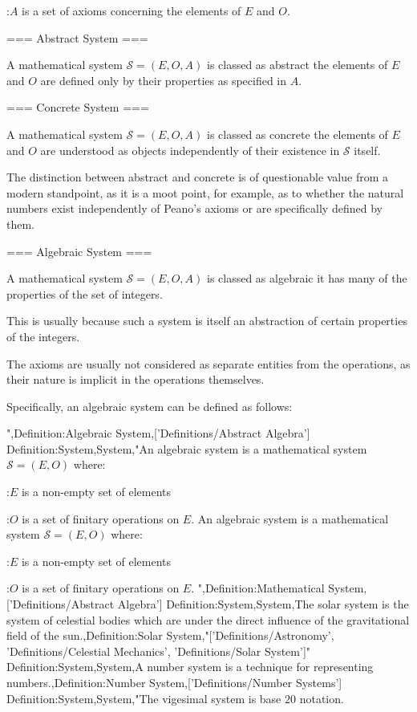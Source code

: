 :$A$ is a set of axioms concerning the elements of $E$ and $O$.


=== Abstract System ===

A mathematical system $\mathcal S = \left( E, O, A \right)$ is classed as abstract  the elements of $E$ and $O$ are defined only by their properties as specified in $A$.


=== Concrete System ===

A mathematical system $\mathcal S = \left( E, O, A \right)$ is classed as concrete  the elements of $E$ and $O$ are understood as objects independently of their existence in $\mathcal S$ itself.


The distinction between abstract and concrete is of questionable value from a modern standpoint, as it is a moot point, for example, as to whether the natural numbers exist independently of Peano's axioms or are specifically defined by them.


=== Algebraic System ===

A mathematical system $\mathcal S = \left( E, O, A \right)$ is classed as algebraic  it has many of the properties of the set of integers.

This is usually because such a system is itself an abstraction of certain properties of the integers.

The axioms are usually not considered as separate entities from the operations, as their nature is implicit in the operations themselves.


Specifically, an algebraic system can be defined as follows:

",Definition:Algebraic System,['Definitions/Abstract Algebra']
Definition:System,System,"An algebraic system is a mathematical system $\mathcal S = \left( E, O \right)$ where:

:$E$ is a non-empty set of elements

:$O$ is a set of finitary operations on $E$.
An algebraic system is a mathematical system $\mathcal S = \left( E, O \right)$ where:

:$E$ is a non-empty set of elements

:$O$ is a set of finitary operations on $E$.
",Definition:Mathematical System,['Definitions/Abstract Algebra']
Definition:System,System,The solar system is the system of celestial bodies which are under the direct influence of the gravitational field of the sun.,Definition:Solar System,"['Definitions/Astronomy', 'Definitions/Celestial Mechanics', 'Definitions/Solar System']"
Definition:System,System,A number system is a technique for representing numbers.,Definition:Number System,['Definitions/Number Systems']
Definition:System,System,"The vigesimal system is base $20$ notation.

